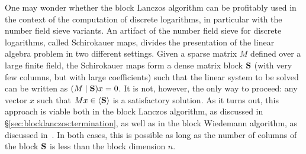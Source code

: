 One may wonder whether the block Lanczos algorithm can be profitably used
in the context of the computation of discrete logarithms, in particular
with the number field sieve variants. An artifact of the number field sieve
for discrete logarithms, called Schirokauer maps, divides the presentation
of the linear algebra problem in two different settings. Given a sparse
matrix $M$ defined over a large finite field, the Schirokauer maps form a
dense matrix block $\mathbf{S}$ (with very few columns, but with large coefficients)
such that the linear system to be solved can be written as
$(M\mid\mathbf{S})x=0$. It is not, however, the only way to proceed: any
vector $x$ such that $Mx\in\langle\mathbf{S}\rangle$ is a satisfactory solution.
As it turns out, this approach is viable both in the block Lanczos
algorithm, as discussed in §\ref{sec:blocklanczos:termination}, as well as in the block
Wiedemann algorithm, as discussed in~\cite[§8]{Coppersmith94}. In both
cases, this is possible as long as the number of columns of the block
$\mathbf{S}$ is less than the block dimension $n$.

%